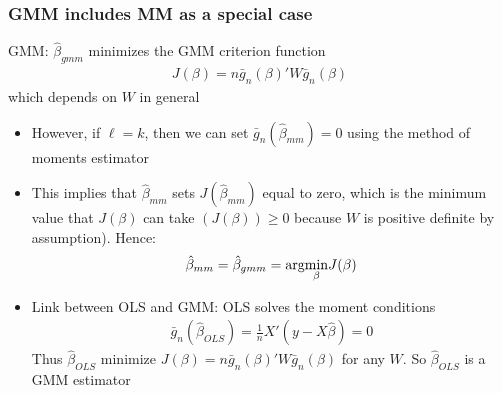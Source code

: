 \documentclass[a4paper,twoside,11pt]{article}
\begin{document}
\subsubsection{GMM includes MM as a special case}
GMM: $\hat{\beta}_{gmm}$ minimizes the GMM criterion function
\begin{equation*}
\begin{aligned}
J(\beta) =n \bar g_n (\beta)' W \bar g_n (\beta)
\end{aligned} 
\end{equation*}
which depends on $W$ in general
\begin{itemize}
    \item However, if $\ell =k$, then we can set $\bar g_n ( \hat{\beta}_{mm}) =0$ using the method of moments estimator
    \item This implies that $\hat{\beta}_{mm}$ sets $J(\hat{\beta}_{mm})$ equal to zero, which is the minimum value that $J(\beta)$ can take $(J(\beta)) \ge 0$ because $W$ is positive definite by assumption). Hence:
\newline
\begin{equation*}
\begin{aligned}
\hat{\beta}_{mm} = \hat{\beta}_{gmm} = \textmd{arg} \underset{\beta}{\min} J(\beta)
\end{aligned} 
\end{equation*}
    \item Link between OLS and GMM: OLS solves the moment conditions
\newline
\begin{equation*}
\begin{aligned}
\bar g_n (\hat{\beta}_{OLS}) = \frac{1}{n} X' (y- X \hat{\beta})=0
\end{aligned} 
\end{equation*}
Thus $\hat{\beta}_{OLS}$ minimize $J(\beta) = n \bar g_n (\beta)' W \bar g_n (\beta)$ for any $W$. So $\hat{\beta}_{OLS}$ is a GMM estimator
\end{itemize}
\end{document}
